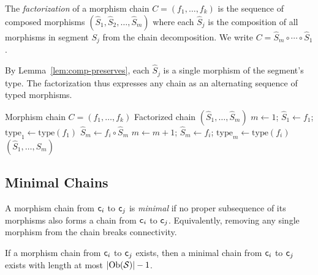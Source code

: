 \documentclass[11pt]{article}
\begin{document}
\begin{definition}\label{def:chain-factor}
The \emph{factorization} of a morphism chain $C = (f_1, \ldots, f_k)$ is
the sequence of composed morphisms $(\hat{S}_1, \hat{S}_2, \ldots, \hat{S}_m)$
where each $\hat{S}_j$ is the composition of all morphisms in segment $S_j$
from the chain decomposition.  We write $C = \hat{S}_m \circ \cdots \circ
\hat{S}_1$.
\end{definition}

By Lemma~\ref{lem:comp-preserves}, each $\hat{S}_j$ is a single morphism
of the segment's type.  The factorization thus expresses any chain as an
alternating sequence of typed morphisms.

\begin{algorithm}[H]
\caption{Chain Factorization}\label{alg:chain-factor}
\begin{algorithmic}[1]
\REQUIRE Morphism chain $C = (f_1, \ldots, f_k)$
\ENSURE Factorized chain $(\hat{S}_1, \ldots, \hat{S}_m)$
\STATE $m \leftarrow 1$; $\hat{S}_1 \leftarrow f_1$; $\mathrm{type}_1 \leftarrow \mathrm{type}(f_1)$
    \STATE $\hat{S}_m \leftarrow f_i \circ \hat{S}_m$
  \ELSE
    \STATE $m \leftarrow m + 1$; $\hat{S}_m \leftarrow f_i$; $\mathrm{type}_m \leftarrow \mathrm{type}(f_i)$
  \ENDIF
\ENDFOR
\RETURN $(\hat{S}_1, \ldots, \hat{S}_m)$
\end{algorithmic}
\end{algorithm}

\subsection{Minimal Chains}\label{sec:minimal-chains}

\begin{definition}\label{def:min-chain}
A morphism chain from $\mathsf{c}_i$ to $\mathsf{c}_j$ is \emph{minimal} if no
proper subsequence of its morphisms also forms a chain from $\mathsf{c}_i$ to
$\mathsf{c}_j$.  Equivalently, removing any single morphism from the chain
breaks connectivity.
\end{definition}

\begin{theorem}\label{thm:min-chain-exist}
If a morphism chain from $\mathsf{c}_i$ to $\mathsf{c}_j$ exists, then a minimal
chain from $\mathsf{c}_i$ to $\mathsf{c}_j$ exists with length at most
$|\mathrm{Ob}(\mathcal{S})| - 1$.
\end{theorem}
\end{document}
